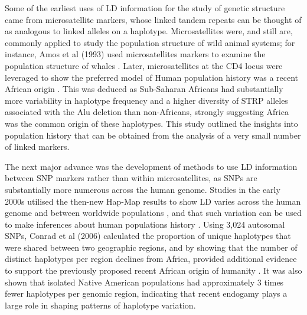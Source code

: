 Some of the earliest uses of LD information for the study of genetic structure came from microsatellite markers, whose linked tandem repeats can be thought of as analogous to linked alleles on a haplotype. Microsatellites were, and still are, commonly applied to study the population structure of wild animal systems; for instance, Amos et al (1993) used microsatellites markers to examine the population structure of whales \cite{amos1993social}. Later, microsatellites at the CD4 locus were leveraged to show the preferred model of Human population history was a recent African origin \cite{tishkoff1996global}. This was deduced as Sub-Saharan Africans had substantially more variability in haplotype frequency and a higher diversity of STRP alleles associated with the Alu deletion than non-Africans, strongly suggesting Africa was the common origin of these haplotypes. This study outlined the insights into population history that can be obtained from the analysis of a very small number of linked markers.  

The next major advance was the development of methods to use LD information between SNP markers rather than within microsatellites, as SNPs are substantially more numerous across the human genome. Studies in the early 2000s utilised the then-new Hap-Map results \cite{gibbs2003international} to show LD varies across the human genome \cite{crawford2004evidence} and between worldwide populations \cite{evans2005comparison, reich2001linkage}, and that such variation can be used to make inferences about human populations history \cite{conrad2006worldwide}. Using 3,024 autosomal SNPs, Conrad et al (2006) calculated the proportion of unique haplotypes that were shared between two geographic regions, and by showing that the number of distinct haplotypes per region declines from Africa, provided additional evidence to support the previously proposed recent African origin of humanity \cite{cann1987mitochondrial}. It was also shown that isolated Native American populations had approximately 3 times fewer haplotypes per genomic region, indicating that recent endogamy plays a large role in shaping patterns of haplotype variation. 
 
